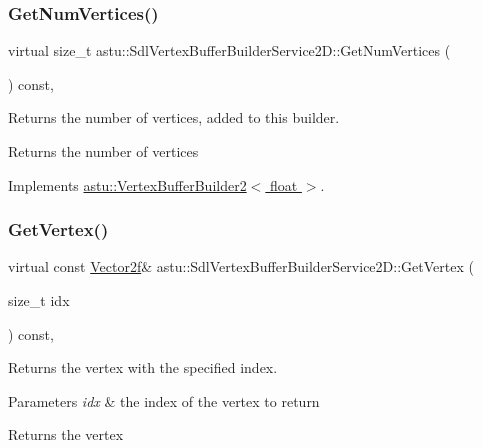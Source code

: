 \subsubsection{\texorpdfstring{Get\+Num\+Vertices()}{GetNumVertices()}}
{\footnotesize\ttfamily virtual size\+\_\+t astu\+::\+Sdl\+Vertex\+Buffer\+Builder\+Service2\+D\+::\+Get\+Num\+Vertices (\begin{DoxyParamCaption}{ }\end{DoxyParamCaption}) const\hspace{0.3cm}{\ttfamily [override]}, {\ttfamily [virtual]}}

Returns the number of vertices, added to this builder.

\begin{DoxyReturn}{Returns}
the number of vertices 
\end{DoxyReturn}


Implements \hyperlink{classastu_1_1VertexBufferBuilder2_ae715cb61f66200f1971b2bd6142b1715}{astu\+::\+Vertex\+Buffer\+Builder2$<$ float $>$}.

\mbox{\label{classastu_1_1SdlVertexBufferBuilderService2D_aaf43c4425363ccb8db57bb8963072a7f}} 
\subsubsection{\texorpdfstring{Get\+Vertex()}{GetVertex()}}
{\footnotesize\ttfamily virtual const \hyperlink{classastu_1_1Vector2}{Vector2f}\& astu\+::\+Sdl\+Vertex\+Buffer\+Builder\+Service2\+D\+::\+Get\+Vertex (\begin{DoxyParamCaption}\item[{size\+\_\+t}]{idx }\end{DoxyParamCaption}) const\hspace{0.3cm}{\ttfamily [override]}, {\ttfamily [virtual]}}

Returns the vertex with the specified index.


\begin{DoxyParams}{Parameters}
{\em idx} & the index of the vertex to return\\
\hline
\end{DoxyParams}
\begin{DoxyReturn}{Returns}
the vertex 
\end{DoxyReturn}

